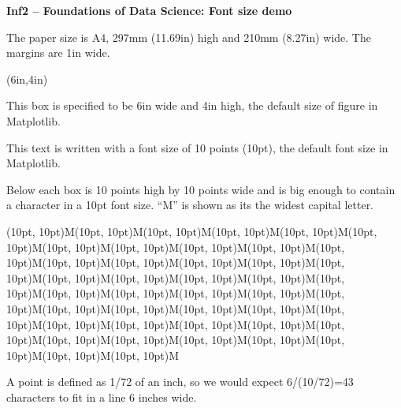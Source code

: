 \documentclass[10,a4paper]{article}
\begin{document}
\sffamily

\begin{center}
  \textbf{Inf2 -- Foundations of Data Science: Font size demo}
\end{center}
\noindent The paper size is A4, 297mm (11.69in) high and 210mm
(8.27in) wide. The margins are 1in wide.

\vspace*{1em}\centering\framebox(6in,4in){
  \begin{minipage}{6in}

This box is specified to be 6in wide and 4in high, the default size
of figure in Matplotlib.

\vspace{0.7\baselineskip}

This text is written with a font size of 10 points (10pt), the default
font size in Matplotlib.

\vspace{0.7\baselineskip}

Below each box is 10 points high by 10 points
wide and is big enough to contain a character in a 10pt font size.
``M'' is shown as its the widest capital letter.

\vspace{0.7\baselineskip}

  \framebox(10pt, 10pt){M}\framebox(10pt, 10pt){M}\framebox(10pt,
10pt){M}\framebox(10pt, 10pt){M}\framebox(10pt,
10pt){M}\framebox(10pt, 10pt){M}\framebox(10pt,
10pt){M}\framebox(10pt, 10pt){M}\framebox(10pt,
10pt){M}\framebox(10pt, 10pt){M}\framebox(10pt,
10pt){M}\framebox(10pt, 10pt){M}\framebox(10pt,
10pt){M}\framebox(10pt, 10pt){M}\framebox(10pt,
10pt){M}\framebox(10pt, 10pt){M}\framebox(10pt,
10pt){M}\framebox(10pt, 10pt){M}\framebox(10pt,
10pt){M}\framebox(10pt, 10pt){M}\framebox(10pt,
10pt){M}\framebox(10pt, 10pt){M}\framebox(10pt,
10pt){M}\framebox(10pt, 10pt){M}\framebox(10pt,
10pt){M}\framebox(10pt, 10pt){M}\framebox(10pt,
10pt){M}\framebox(10pt, 10pt){M}\framebox(10pt,
10pt){M}\framebox(10pt, 10pt){M}\framebox(10pt,
10pt){M}\framebox(10pt, 10pt){M}\framebox(10pt,
10pt){M}\framebox(10pt, 10pt){M}\framebox(10pt,
10pt){M}\framebox(10pt, 10pt){M}\framebox(10pt, 10pt){M}\framebox(10pt,
10pt){M}\framebox(10pt, 10pt){M}\framebox(10pt,
10pt){M}\framebox(10pt, 10pt){M}\framebox(10pt, 10pt){M}\framebox(10pt, 10pt){M}

\vspace{0.7\baselineskip}

A point is defined as 1/72 of an inch, so we would expect 6/(10/72)=43
characters to fit in a line 6 inches wide.


\end{minipage}}
\end{document}
